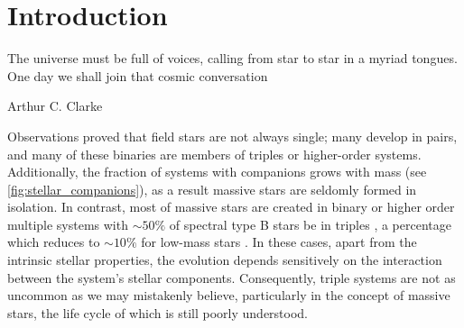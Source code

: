 \chapter{Introduction}

\epigraph{The universe must be full of voices, calling from star to star in a myriad tongues. One day we shall join that cosmic conversation}{Arthur C. Clarke}

Observations proved that field stars are not always single; many develop in pairs, and many of these binaries are members of triples or higher-order systems. Additionally, the fraction of systems with companions grows with mass (see \cref{fig:stellar_companions}), as a result massive stars are seldomly formed in isolation. In contrast, most of massive stars are created in binary or higher order multiple systems with $\sim 50\%$ of spectral type B stars be in triples \citep{sana2014southern,moe2017mind}, a percentage which reduces to $\sim 10\%$ for low-mass stars \citep{raghavan2010survey,toonen2014popcorn,moe2017mind}. In these cases, apart from the intrinsic stellar properties, the evolution depends sensitively on the interaction between the system's stellar components. Consequently, triple systems are not as uncommon as we may mistakenly believe, particularly in the concept of massive stars, the life cycle of which is still poorly understood.

